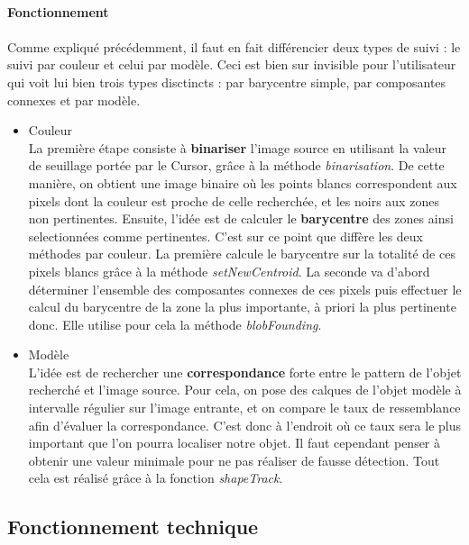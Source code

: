 \documentclass{report}
\begin{document}
						\paragraph{Fonctionnement}\paragraph{}
						Comme expliqué précédemment, il faut en fait différencier deux types de suivi : le suivi par couleur et celui par modèle. Ceci est bien sur invisible pour l'utilisateur qui voit lui bien trois types disctincts : par barycentre simple, par composantes connexes et par modèle.\\
						\begin{itemize}
							\item{\textcolor{vert}{Couleur}}\\
							La première étape consiste à \textbf{binariser} l'image source en utilisant la valeur de seuillage portée par le Cursor, grâce à la méthode \textit{binarisation}. De cette manière, on obtient une image binaire où les points blancs correspondent aux pixels dont la couleur est proche de celle recherchée, et les noirs aux zones non pertinentes. Ensuite, l'idée est de calculer le \textbf{barycentre} des zones ainsi selectionnées comme pertinentes. C'est sur ce point que diffère les deux méthodes par couleur. La première calcule le barycentre sur la totalité de ces pixels blancs grâce à la méthode \textit{setNewCentroid}. La seconde va d'abord déterminer l'ensemble des composantes connexes de ces pixels puis effectuer le calcul du barycentre de la zone la plus importante, à priori la plus pertinente donc. Elle utilise pour cela la méthode \textit{blobFounding}.\\
							\item{\textcolor{marron}{Modèle}}\\
							L'idée est de rechercher une \textbf{correspondance} forte entre le pattern de l'objet recherché et l'image source. Pour cela, on pose des calques de l'objet modèle à intervalle régulier sur l'image entrante, et on compare le taux de ressemblance afin d'évaluer la correspondance. C'est donc à l'endroit où ce taux sera le plus important que l'on pourra localiser notre objet. Il faut cependant penser à obtenir une valeur minimale pour ne pas réaliser de fausse détection. Tout cela est réalisé grâce à la fonction \textit{shapeTrack}.
						\end{itemize}
						\newpage
				\subsection{Fonctionnement technique}
\end{document}
